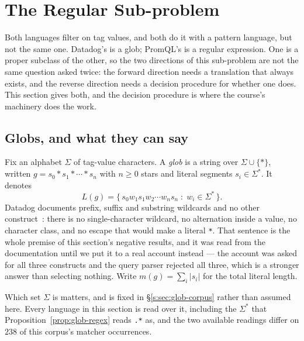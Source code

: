 
\section{The Regular Sub-problem}
\label{s:sec:regular}

Both languages filter on tag values, and both do it with a pattern language, but not the
same one. Datadog's is a glob; PromQL's is a regular expression. One is a proper subclass
of the other, so the two directions of this sub-problem are not the same question asked
twice: the forward direction needs a translation that always exists, and the reverse
direction needs a decision procedure for whether one does. This section gives both, and
the decision procedure is where the course's machinery does the work.

\subsection{Globs, and what they can say}
\label{s:sec:globs}

\begin{definition}\label{def:glob}
Fix an alphabet $\Sigma$ of tag-value characters. A \emph{glob} is a string over
$\Sigma\cup\{*\}$, written $g=s_0*s_1*\cdots*s_n$ with $n\ge 0$ stars and literal
segments $s_i\in\Sigma^{*}$. It denotes
\[
L(g)=\{\,s_0w_1s_1w_2\cdots w_ns_n \;:\; w_i\in\Sigma^{*}\,\}.
\]
Datadog documents prefix, suffix and substring wildcards and no other
construct~\citep{ddfilter}: there is no single-character wildcard, no alternation inside
a value, no character class, and no escape that would make a literal \texttt{*}. That
sentence is the whole premise of this section's negative results, and it was read from
the documentation until we put it to a real account instead --- the account was asked for
all three constructs and the query parser rejected all three, which is a stronger answer
than selecting nothing. Write $m(g)=\sum_i|s_i|$ for the total literal length.

Which set $\Sigma$ is matters, and is fixed in \S\ref{s:sec:glob-corpus} rather than
assumed here. Every language in this section is read over it, including the $\Sigma^{*}$
that Proposition~\ref{prop:glob-regex} reads \texttt{.*} as, and the two available
readings differ on $238$ of this corpus's matcher occurrences.
\end{definition}

